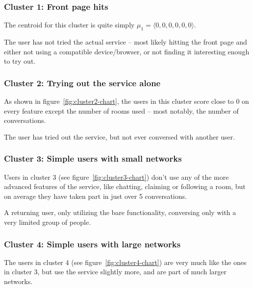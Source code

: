 \subsubsection{Cluster 1: Front page hits}

The centroid for this cluster is quite simply $\mu_1 = \langle 0, 0, 0, 0, 0, 0 \rangle$.

\begin{persona}
  The user has not tried the actual service -- most likely hitting the front page and either not using a compatible device/browser, or not finding it interesting enough to try out.
\end{persona}

\subsubsection{Cluster 2: Trying out the service alone}

As shown in figure~\ref{fig:cluster2-chart}, the users in this cluster score close to 0 on every feature except the number of rooms used -- most notably, the number of conversations.

\begin{persona}
  The user has tried out the service, but not ever conversed with another user.
\end{persona}

\subsubsection{Cluster 3: Simple users with small networks}

Users in cluster 3 (see figure~\ref{fig:cluster3-chart}) don't use any of the more advanced features of the service, like chatting, claiming or following a room, but on average they have taken part in just over 5 conversations.

\begin{persona}
  A returning user, only utilizing the bare functionality, conversing only with a very limited group of people.
\end{persona}

\subsubsection{Cluster 4: Simple users with large networks}

The users in cluster 4 (see figure~\ref{fig:cluster4-chart}) are very much like the ones in cluster 3, but use the service slightly more, and are part of much larger networks.

